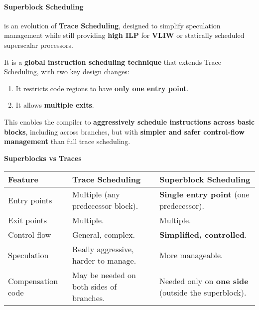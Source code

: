 \paragraph{Superblock Scheduling}

 is an evolution of \textbf{Trace Scheduling}, designed to simplify speculation management while still providing \textbf{high ILP} for \textbf{VLIW} or statically scheduled superscalar processors.

\highspace
It is a \textbf{global instruction scheduling technique} that extends Trace Scheduling, with two key design changes:
\begin{enumerate}
    \item It restricts code regions to have \textbf{only one entry point}.
    \item It allows \textbf{multiple exits}.
\end{enumerate}
This enables the compiler to \textbf{aggressively schedule instructions across basic blocks}, including across branches, but with \textbf{simpler and safer control-flow management} than full trace scheduling.

\highspace
\begin{flushleft}
    \textcolor{Green3}{ \textbf{Superblocks vs Traces}}
\end{flushleft}
\begin{table}[!htp]
    \centering
    \begin{tabular}{@{} l p{11em} p{11em} @{}}
        \toprule
        Feature & \textbf{Trace} Scheduling & \textbf{Superblock} Scheduling \\
        \midrule
        Entry points        & Multiple (any predecessor block).         & \textbf{Single entry point} (one predecessor).            \\ [.5em]
        Exit points         & Multiple.                                 & Multiple.                                                 \\ [.5em]
        Control flow        & General, complex.                         & \textbf{Simplified, controlled}.                          \\ [.5em]
        Speculation         & Really aggressive, harder to manage.             & More manageable.                                          \\ [.5em]
        Compensation code   & May be needed on both sides of branches.  & Needed only on \textbf{one side} (outside the superblock).\\
        \bottomrule
    \end{tabular}
\end{table}

